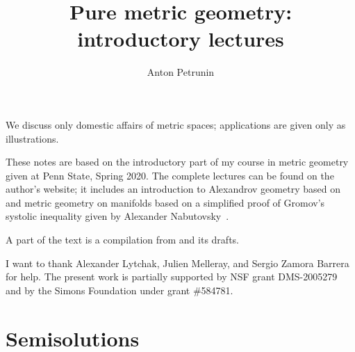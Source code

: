 \documentclass[twoside]{book}
\begin{document}

 
\title{Pure metric geometry:\\
introductory lectures}
\author{Anton Petrunin}
\date{}
\maketitle

We discuss only domestic affairs of metric spaces;
applications are given only as illustrations.

These notes are based on the introductory part of my course in metric geometry given at Penn State, Spring 2020.
The complete lectures can be found on the author's website;
it includes an introduction to Alexandrov geometry based on \cite{alexander-kapovitch-petrunin-2019} and metric geometry on manifolds \cite{petrunin2020mnfld} based on a simplified proof of Gromov's systolic inequality given by Alexander Nabutovsky~\cite{nabutovsky}.

A part of the text is a compilation from \cite{alexander-kapovitch-petrunin-2019, alexander-kapovitch-petrunin-2025, petrunin-yashinski, petrunin-2009, petrunin-zamorabarrera} and its drafts.

I want to thank
Alexander Lytchak,
Julien Melleray,
and Sergio Zamora Barrera for help.
The present work is partially supported by NSF grant DMS-2005279
and by the Simons Foundation under grant \#584781.

\thispagestyle{empty}
\tableofcontents
\thispagestyle{empty}






%

\appendix
\chapter{Semisolutions}






{\small\sloppy


\def\emph{\textit}

\printbibliography[heading=bibintoc]
\fussy
}
\end{document}
